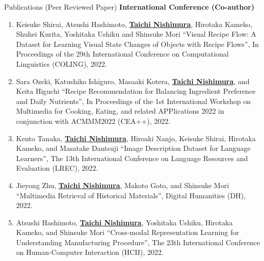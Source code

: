 \begin{rSection}{Publications (Peer Reviewed Paper)}
{\bf International Conference (Co-author)}
\vspace{-0.15cm}
\begin{enumerate}
    \item Keisuke Shirai, Atsushi Hashimoto, \underline{{\bf Taichi Nishimura}}, Hirotaka Kameko, Shuhei Kurita, Yoshitaka Ushiku and Shinsuke Mori ``Visual Recipe Flow: A Dataset for Learning Visual State Changes of Objects with Recipe Flows'', In Proceedings of the 29th International Conference on Computational Linguistics (COLING), 2022.
    \item Sara Ozeki, Katushiko Ishiguro, Masaaki Kotera, \underline{{\bf Taichi Nishimura}}, and Keita Higuchi ``Recipe Recommendation for Balancing Ingredient Preference and Daily Nutrients'', In Proceedings of the 1st International Workshop on Multimedia for Cooking, Eating, and related APPlications 2022 in conjunction with ACMMM2022 (CEA++), 2022.
    \item Kento Tanaka, \underline{{\bf Taichi Nishimura}}, Hiroaki Nanjo, Keisuke Shirai, Hirotaka Kameko, and Masatake Dantsuji ``Image Description Dataset for Language Learners'', The 13th International Conference on Language Resources and Evaluation (LREC), 2022.
    \item Jieyong Zhu, \underline{{\bf Taichi Nishimura}}, Makoto Goto, and Shinsuke Mori ``Multimedia Retrieval of Historical Materials'', Digital Humanities (DH), 2022.
    \item Atsushi Hashimoto, \underline{{\bf Taichi Nishimura}}, Yoshitaka Ushiku, Hirotaka Kameko, and Shinsuke Mori ``Cross-modal Representation Learning for Understanding Manufacturing Procedure'', The 23th International Conference on Human-Computer Interaction (HCII), 2022.
\end{enumerate}
\end{rSection}

